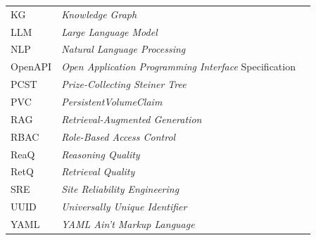 \begin{longtable}{@{} l >{\raggedright\arraybackslash}p{8cm} c @{}}
KG       & \textit{Knowledge Graph}                                       & \pageref{chap:pendahuluan} \\
LLM      & \textit{Large Language Model}                                  & \pageref{chap:pendahuluan} \\
NLP      & \textit{Natural Language Processing}                           & \pageref{chap:studi-literatur} \\
OpenAPI  & \textit{Open Application Programming Interface} Specification  & \pageref{chap:pendahuluan} \\
PCST     & \textit{Prize-Collecting Steiner Tree}                         & \pageref{chap:analisis-masalah} \\
PVC      & \textit{PersistentVolumeClaim}                                 & \pageref{chap:studi-literatur} \\
RAG      & \textit{Retrieval-Augmented Generation}                        & \pageref{chap:pendahuluan} \\
RBAC     & \textit{Role-Based Access Control}                             & \pageref{chap:studi-literatur} \\
ReaQ     & \textit{Reasoning Quality}                                     & \pageref{sec:metrik-evaluasi} \\
RetQ     & \textit{Retrieval Quality}                                     & \pageref{sec:metrik-evaluasi} \\
SRE      & \textit{Site Reliability Engineering}                          & \pageref{chap:evaluasi} \\
UUID     & \textit{Universally Unique Identifier}                         & \pageref{chap:perancangan} \\
YAML     & \textit{YAML Ain't Markup Language}                            & \pageref{chap:pendahuluan} \\

\end{longtable}
